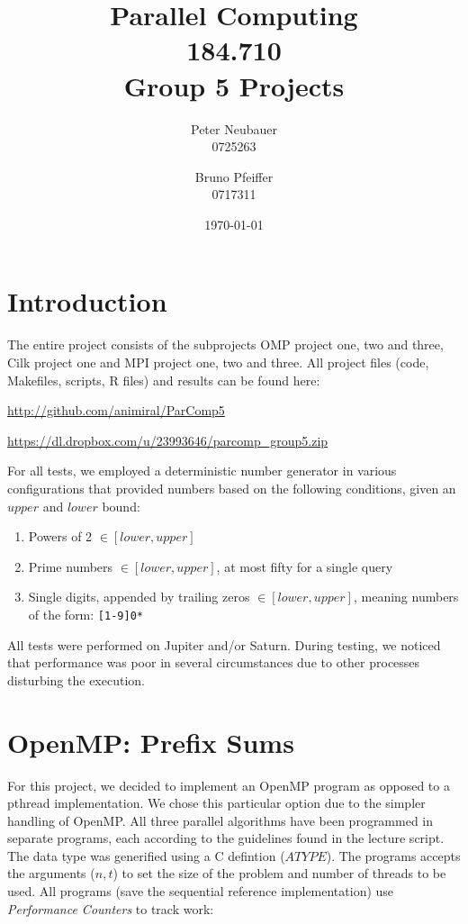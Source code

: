 \documentclass[12pt]{article}
\begin{document}
\title{Parallel Computing\\184.710\\Group 5 Projects}
\author{Peter Neubauer\\ 0725263 \and Bruno Pfeiffer \\ 0717311}
\date{\today}
\maketitle
\newpage
\tableofcontents

\newpage
\section{Introduction}

The entire project consists of the subprojects OMP project one, two and three, Cilk project one and MPI project one, two and three. All project files (code, Makefiles, scripts, R files) and results can be found here:

\begin{center}
\url{http://github.com/animiral/ParComp5}

\url{https://dl.dropbox.com/u/23993646/parcomp_group5.zip}
\end{center}

For all tests, we employed a deterministic number generator in various configurations that provided numbers based on the following conditions, given an $upper$ and $lower$ bound:
\begin{enumerate}
\item Powers of 2 $ \in [lower, upper]$
\item Prime numbers $\in [lower, upper]$, at most fifty for a single query
\item Single digits, appended by trailing zeros $\in [lower, upper]$, meaning numbers of the form: \verb=[1-9]0*=
\end{enumerate}
All tests were performed on Jupiter and/or Saturn. During testing, we noticed that performance was poor in several circumstances due to other processes disturbing the execution.

\newpage
\section{OpenMP: Prefix Sums}
For this project, we decided to implement an OpenMP program as opposed to a pthread implementation. We chose this particular option due to the simpler handling of OpenMP. All three parallel algorithms have been programmed in separate programs, each according to the guidelines found in the lecture script. The data type was generified using a C defintion ($ATYPE$). The programs accepts the arguments ($n, t$) to set the size of the problem and number of threads to be used.
All programs (save the sequential reference implementation) use \emph{Performance Counters} to track work:
\end{document}
